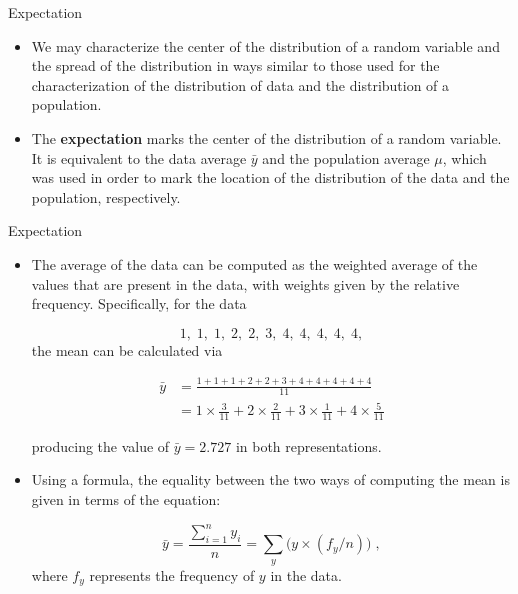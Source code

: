 \documentclass[10pt,handout]{beamer}\usepackage[]{graphicx}\usepackage[]{color}
\begin{document}
\begin{frame}[fragile]{Expectation}
	\small
	\begin{itemize}[<+->]
		
		\item We may characterize the center of the distribution of a random variable
		and the spread of the distribution in ways similar to those used for the
		characterization of the distribution of data and the distribution of a
		population.
		
		\item The \textbf{expectation} marks the center of the distribution of a random
		variable. It is equivalent to the data average $\bar y$ and the
		population average $\mu$, which was used in order to mark the location
		of the distribution of the data and the population, respectively.
		

	\end{itemize}
	
\end{frame}



\begin{frame}[fragile]{Expectation}
	\small
	\begin{itemize}[<+->]
		
		\item The average of the data can be computed as the weighted average of the values that are present
		in the data, with weights given by the relative frequency. Specifically,
		for the data
		
		$$1,\; 1,\; 1,\; 2,\; 2,\; 3,\; 4,\; 4,\; 4,\; 4,\; 4,$$ the mean can be calculated via
		
		\begin{align*}
			\bar{y} &= \frac{1 + 1 + 1 + 2 + 2 + 3 + 4 + 4 + 4 + 4 + 4}{11}\\
			& =	1\times \frac{3}{11} + 2 \times \frac{2}{11} + 3 \times \frac{1}{11} + 4 \times \frac{5}{11}
		\end{align*}

		producing the value of $\bar y =2.727$ in both representations. 
		
		\item Using a formula, the equality between the two ways of computing the mean is
		given in terms of the equation:
		
		$$\bar y = \frac{\sum_{i=1}^n y_i}{n} = \sum_y \big(y \times (f_y/n)\big)\;,$$
		where $f_y$ represents the frequency of $y$ in the data. 
		

		
		
	\end{itemize}
	
\end{frame}
\end{document}

